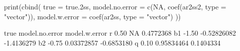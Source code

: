\begin{Schunk}
\begin{Sinput}
 print(cbind(
   true = true.2ss,
   model.no.error = c(NA, coef(ar2ss2, type = "vector")),
   model.w.error = coef(ar2ss, type = "vector")
 ))
\end{Sinput}
\begin{Soutput}
    true model.no.error model.w.error
r   0.50             NA     0.4772368
b1 -1.50    -0.52826082    -1.4136279
b2 -0.75     0.03372857    -0.6853180
q   0.10     0.95834464     0.1404334
\end{Soutput}
\end{Schunk}
